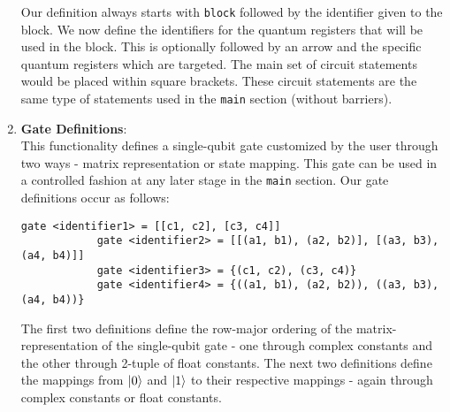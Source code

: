 \documentclass{article}
\begin{document}
\begin{enumerate}
		Our definition always starts with \texttt{block} followed by the identifier given to the block. We now define the identifiers for the quantum registers that will be used in the block. This is optionally followed by an arrow and the specific quantum registers which are targeted. The main set of circuit statements would be placed within square brackets. These circuit statements are the same type of statements used in the \texttt{main} section (without barriers).
	\item \textbf{Gate Definitions}: \\
		This functionality defines a single-qubit gate customized by the user through two ways - matrix representation or state mapping. This gate can be used in a controlled fashion at any later stage in the \texttt{main} section. Our gate definitions occur as follows:
		\begin{lstlisting}[caption=Gate Definitions through Matrix Representation]
			gate <identifier1> = [[c1, c2], [c3, c4]]
			gate <identifier2> = [[(a1, b1), (a2, b2)], [(a3, b3), (a4, b4)]]
			gate <identifier3> = {(c1, c2), (c3, c4)}
			gate <identifier4> = {((a1, b1), (a2, b2)), ((a3, b3), (a4, b4))}
		\end{lstlisting}
		The first two definitions define the row-major ordering of the matrix-representation of the single-qubit gate - one through complex constants and the other through 2-tuple of float constants. The next two definitions define the mappings from $\ket{0}$ and $\ket{1}$ to their respective mappings - again through complex constants or float constants.
\end{enumerate}
\end{document}
